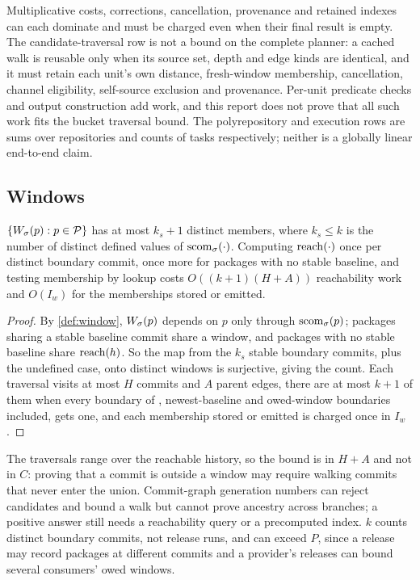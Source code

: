 Multiplicative costs, corrections, cancellation, provenance and retained
indexes can each dominate and must be charged even when their final result is
empty. The candidate-traversal row is not a bound on the complete planner: a
cached walk is reusable only when its source set, depth and edge kinds are
identical, and it must retain each unit's own distance, fresh-window
membership, cancellation, channel eligibility, self-source exclusion and
provenance. Per-unit predicate checks and output construction add work, and
this report does not prove that all such work fits the bucket traversal
bound. The polyrepository and execution rows are sums over repositories and
counts of tasks respectively; neither is a globally linear end-to-end claim.

\subsection{Windows}

\begin{proposition}
\label{prop:windows}
$\{W_{\sigma}(p) : p \in \mathcal{P}\}$ has at most $k_s + 1$ distinct members, where
$k_s \le k$ is the number of distinct defined values of $\mathrm{scom}_{\sigma}(\cdot)$.
Computing $\mathrm{reach}(\cdot)$ once per distinct boundary commit, once more for
packages with no stable baseline, and testing membership by lookup costs
$O((k+1)(H + A))$ reachability work and $O(I_w)$ for the memberships stored
or emitted.
\end{proposition}

\begin{proof}
By \cref{def:window}, $W_{\sigma}(p)$ depends on $p$ only through
$\mathrm{scom}_{\sigma}(p)$; packages sharing a stable baseline commit share a window,
and packages with no stable baseline share $\mathrm{reach}(h)$. So the map from the
$k_s$ stable boundary commits, plus the undefined case, onto distinct windows
is surjective, giving the count. Each traversal visits at most $H$ commits and
$A$ parent edges, there are at most $k + 1$ of them when every boundary of
, newest-baseline and owed-window boundaries included, gets one,
and each membership stored or emitted is charged once in $I_w$.
\end{proof}

The traversals range over the reachable history, so the bound is in $H + A$
and not in $C$: proving that a commit is outside a window may require walking
commits that never enter the union. Commit-graph generation numbers can
reject candidates and bound a walk but cannot prove ancestry across branches;
a positive answer still needs a reachability query or a precomputed index. $k$
counts distinct boundary commits, not release runs, and can exceed $P$, since
a release may record packages at different commits and a provider's releases
can bound several consumers' owed windows.

